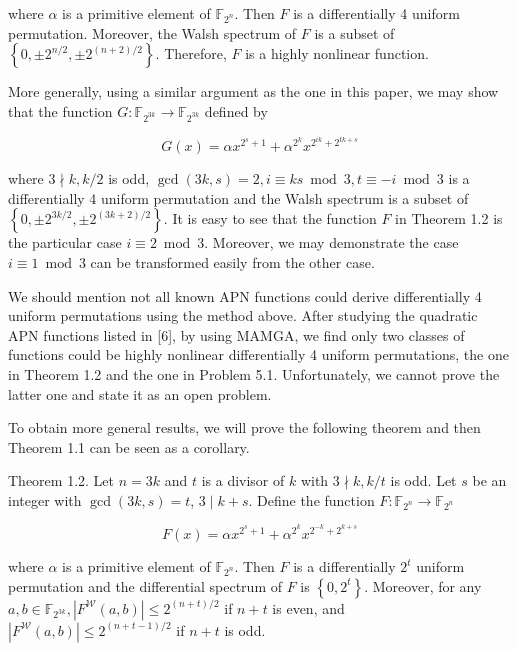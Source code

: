 \documentclass[10pt]{article}
\begin{document}
where $\alpha$ is a primitive element of $\mathbb{F}_{2^{n}}$. Then $F$ is a differentially 4 uniform permutation. Moreover, the Walsh spectrum of $F$ is a subset of $\left\{0, \pm 2^{n / 2}, \pm 2^{(n+2) / 2}\right\}$. Therefore, $F$ is a highly nonlinear function.

More generally, using a similar argument as the one in this paper, we may show that the function $G: \mathbb{F}_{2^{3 k}} \rightarrow \mathbb{F}_{2^{3 k}}$ defined by

$$
G(x)=\alpha x^{2^{s}+1}+\alpha^{2^{k}} x^{2^{i k}+2^{t k+s}}
$$

where $3 \nmid k, k / 2$ is odd, $\operatorname{gcd}(3 k, s)=2, i \equiv k s \bmod 3, t \equiv-i \bmod 3$ is a differentially 4 uniform permutation and the Walsh spectrum is a subset of $\left\{0, \pm 2^{3 k / 2}, \pm 2^{(3 k+2) / 2}\right\}$. It is easy to see that the function $F$ in Theorem 1.2 is the particular case $i \equiv 2 \bmod 3$. Moreover, we may demonstrate the case $i \equiv 1 \bmod 3$ can be transformed easily from the other case.

We should mention not all known APN functions could derive differentially 4 uniform permutations using the method above. After studying the quadratic APN functions listed in [6], by using MAMGA, we find only two classes of functions could be highly nonlinear differentially 4 uniform permutations, the one in Theorem 1.2 and the one in Problem 5.1. Unfortunately, we cannot prove the latter one and state it as an open problem.

To obtain more general results, we will prove the following theorem and then Theorem 1.1 can be seen as a corollary.

Theorem 1.2. Let $n=3 k$ and $t$ is a divisor of $k$ with $3 \nmid k, k / t$ is odd. Let $s$ be an integer with $\operatorname{gcd}(3 k, s)=t$, $3 \mid k+s$. Define the function $F: \mathbb{F}_{2^{n}} \rightarrow \mathbb{F}_{2^{n}}$


\begin{equation*}
F(x)=\alpha x^{2^{s}+1}+\alpha^{2^{k}} x^{2^{-k}+2^{k+s}} \tag{2}
\end{equation*}


where $\alpha$ is a primitive element of $\mathbb{F}_{2^{n}}$. Then $F$ is a differentially $2^{t}$ uniform permutation and the differential spectrum of $F$ is $\left\{0,2^{t}\right\}$. Moreover, for any $a, b \in \mathbb{F}_{2^{3 k}},\left|F^{\mathcal{W}}(a, b)\right| \leqslant 2^{(n+t) / 2}$ if $n+t$ is even, and $\left|F^{\mathcal{W}}(a, b)\right| \leqslant 2^{(n+t-1) / 2}$ if $n+t$ is odd.
\end{document}
